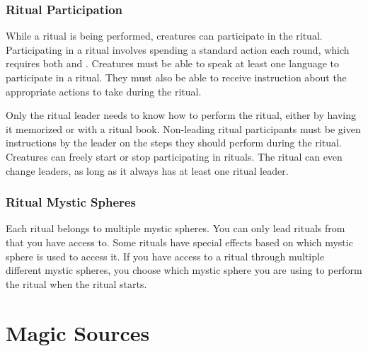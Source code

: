     \subsubsection{Ritual Participation}
      While a ritual is being performed, creatures can participate in the ritual.
      Participating in a ritual involves spending a standard action each round, which requires both  and .
      Creatures must be able to speak at least one language to participate in a ritual.
      They must also be able to receive instruction about the appropriate actions to take during the ritual.

      Only the ritual leader needs to know how to perform the ritual, either by having it memorized or with a ritual book.
      Non-leading ritual participants must be given instructions by the leader on the steps they should perform during the ritual.
      Creatures can freely start or stop participating in rituals.
      The ritual can even change leaders, as long as it always has at least one ritual leader.

    \subsubsection{Ritual Mystic Spheres}
      Each ritual belongs to multiple mystic spheres.
      You can only lead rituals from  that you have access to.
      Some rituals have special effects based on which mystic sphere is used to access it.
      If you have access to a ritual through multiple different mystic spheres, you choose which mystic sphere you are using to perform the ritual when the ritual starts.


\section{Magic Sources}\label{Magic Sources}

